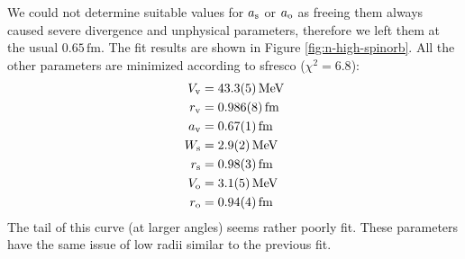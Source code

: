 \documentclass[fleqn, 12pt]{article}
\begin{document}
We could not determine suitable values for $a_{\text s}$ or $a_{\text o}$ as
freeing them always caused severe divergence and unphysical parameters,
therefore we left them at the usual $0.65\,\mathrm{fm}$.  The fit results are
shown in Figure \ref{fig:n-high-spinorb}.  All the other parameters are
minimized according to sfresco ($\chi^2 = 6.8$):
\begin{align*}
  V_{\text v} &= 43.3(5)\,\mathrm{MeV} \\
  r_{\text v} &= 0.986(8)\,\mathrm{fm} \\
  a_{\text v} &= 0.67(1)\,\mathrm{fm} \\
  W_{\text s} &= 2.9(2)\,\mathrm{MeV} \\
  r_{\text s} &= 0.98(3)\,\mathrm{fm} \\
  V_{\text o} &= 3.1(5)\,\mathrm{MeV} \\
  r_{\text o} &= 0.94(4)\,\mathrm{fm} \\
\end{align*}
The tail of this curve (at larger angles) seems rather poorly fit.  These
parameters have the same issue of low radii similar to the previous fit.
\end{document}
